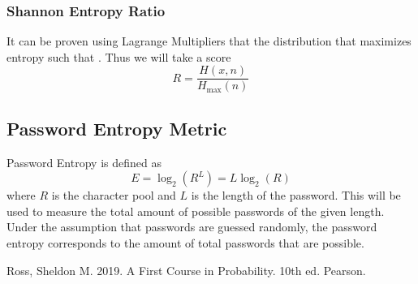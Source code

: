 \documentclass{article}
\begin{document}
\subsubsection{Shannon Entropy Ratio}
It can be proven using Lagrange Multipliers that the distribution that maximizes entropy such that .
Thus we will take a score 
\[
R = \frac{H(x, n)}{H_{\text{max}}(n)}
\]

\subsection{Password Entropy Metric}
Password Entropy is defined as 
\[
E=\log_2(R^L) = L\log_2(R)
\]
where $R$ is the character pool and $L$ is the length of the password.
This will be used to measure the total amount of possible passwords of the given length. Under the assumption that passwords are guessed randomly, the password entropy corresponds to the amount of total passwords that are possible.  



\newpage
\begin{thebibliography}{00}
 Ross, Sheldon M. 2019. A First Course in Probability. 10th ed. Pearson.
\end{thebibliography}
\end{document}
